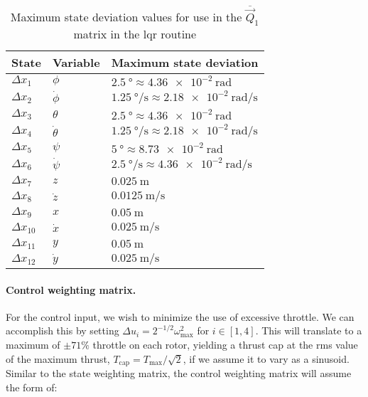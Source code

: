\begin{table}[H]
	\centering
	\caption{Maximum state deviation values for use in the $\overline{\vec{Q}}_1$ matrix in the \gls{lqr} routine}
	\label{tab:maximum state deviation}
	\begin{tabularx}{.55\linewidth}{l l X}
		\toprule
		\textbf{State} & \textbf{Variable} & \textbf{Maximum state deviation} \\
		\midrule
		$\Delta x_1$ & $\phi$ & $\SI{2.5}{\degree} \approx \SI{4.36e-2}{\radian}$ \\
		$\Delta x_2$ & $\dot\phi$ & $\SI{1.25}{\degree\per\second} \approx \SI{2.18e-2}{\radian\per\second}$ \\
		$\Delta x_3$ & $\theta$ & $\SI{2.5}{\degree} \approx \SI{4.36e-2}{\radian}$ \\
		$\Delta x_4$ & $\dot\theta$ & $\SI{1.25}{\degree\per\second} \approx \SI{2.18e-2}{\radian\per\second}$ \\
		$\Delta x_5$ & $\psi$ & $\SI{5}{\degree} \approx \SI{8.73e-2}{\radian}$ \\
		$\Delta x_6$ & $\dot\psi$ & $\SI{2.5}{\degree\per\second} \approx \SI{4.36e-2}{\radian\per\second}$ \\
		$\Delta x_7$ & $z$ & $\SI{0.025}{\meter}$ \\
		$\Delta x_8$ & $\dot z$ & $\SI{0.0125}{\meter\per\second}$ \\
		$\Delta x_9$ & $x$ & $\SI{0.05}{\meter}$ \\
		$\Delta x_{10}$ & $\dot x$ & $\SI{0.025}{\meter\per\second}$ \\
		$\Delta x_{11}$ & $y$ & $\SI{0.05}{\meter}$ \\
		$\Delta x_{12}$ & $\dot y$ & $\SI{0.025}{\meter\per\second}$ \\
		\bottomrule
	\end{tabularx}
\end{table}

\paragraph{Control weighting matrix.} For the control input, we wish to minimize the use of excessive throttle. We can accomplish this by setting $\Delta u_i = 2^{-1/2} \omega^2_{\text{max}}$ for $i \in [1,4]$. This will translate to a maximum of $\pm 71\%$ throttle on each rotor, yielding a thrust cap at the \gls{rms} value of the maximum thrust, $T_{\text{cap}} = T_{\text{max}}/\sqrt{2}$, if we assume it to vary as a sinusoid. Similar to the state weighting matrix, the control weighting matrix will assume the form of:

